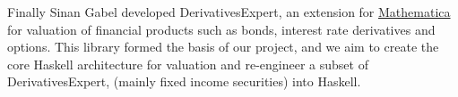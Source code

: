 Finally Sinan Gabel developed DerivativesExpert\cite{Mathematica:DerivativesExpert},
an extension for \href{http://www.wolfram.com/mathematica/}{Mathematica}
for valuation of financial products such as bonds, interest rate derivatives 
and options. This library formed the basis of our project, and we aim to create
the core Haskell architecture for valuation and re-engineer a subset of DerivativesExpert, 
(mainly fixed income securities) into Haskell.

